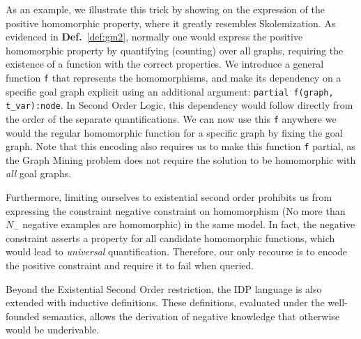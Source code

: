\documentclass{article}
\theoremstyle{definition}
\begin{document}
As an example, we illustrate this trick by showing on the expression of the positive homomorphic property, where it greatly resembles Skolemization.
As evidenced in \textbf{Def.}~\ref{def:gm2}, normally one would express the positive homomorphic property by quantifying (counting) over all graphs, requiring the existence of a function with the correct properties.
We introduce a general function \verb|f| that represents the homomorphisms, and make its dependency on a specific goal graph explicit using an additional argument:
\verb|partial f(graph, t_var):node|.
In Second Order Logic, this dependency would follow directly from the order of the separate quantifications.
We can now use this \verb|f| anywhere we would the regular homomorphic function for a specific graph by fixing the goal graph.
Note that this encoding also requires us to make this function \verb|f| partial, as the Graph Mining problem does not require the solution to be homomorphic with \emph{all} goal graphs.

Furthermore, limiting ourselves to existential second order prohibits us from expressing the constraint negative constraint on homomorphism (No more than $N_{-}$ negative examples are homomorphic) in the same model.
In fact, the negative constraint asserts a property for all candidate homomorphic functions, which would lead to \emph{universal} quantification.
Therefore, our only recourse is to encode the positive constraint and require it to fail when queried.

Beyond the Existential Second Order restriction, the IDP language is also extended with inductive definitions. These definitions, evaluated under the well-founded semantics, allows the derivation of negative knowledge that otherwise would be underivable.
\reversemarginpar
{}
\end{document}
